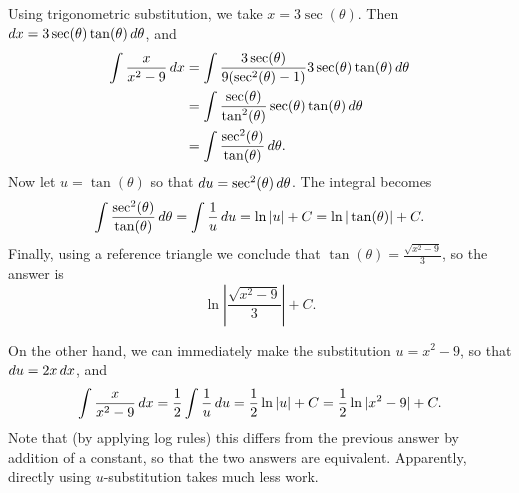 \documentclass[noauthor]{ximera}
\begin{document}
\begin{freeResponse}
Using trigonometric substitution, we take $x = 3 \sec(\theta)$. Then $\mathop{}\!d x = 3 \sec(\theta) \tan(\theta) \mathop{}\!d \theta$, and 
\begin{align*}
\int \frac{x}{x^2-9} \mathop{}\!d x &= \int \frac{3 \sec(\theta)}{9(\sec^2(\theta) - 1)} 3 \sec(\theta) \tan(\theta) \mathop{}\!d \theta \\
&= \int \frac{\sec(\theta)}{\tan^2(\theta)} \sec(\theta) \tan(\theta) \mathop{}\!d \theta \\
&= \int \frac{\sec^2(\theta)}{\tan(\theta)} \mathop{}\!d \theta.
\end{align*}
Now let $u = \tan(\theta)$ so that $\mathop{}\!d u = \sec^2(\theta) \mathop{}\!d \theta$. The integral becomes
$$
\int \frac{\sec^2(\theta)}{\tan(\theta)} \mathop{}\!d \theta = \int \frac{1}{u} \mathop{}\!d u = \ln |u| + C = \ln | \tan(\theta) | + C.
$$
Finally, using a reference triangle we conclude that $\tan(\theta) = \frac{\sqrt{x^2-9}}{3}$, so the answer is 
$$
\ln \left| \frac{\sqrt{x^2-9}}{3}\right| + C.
$$

On the other hand, we can immediately make the substitution $u = x^2 - 9$, so that $\mathop{}\!d u = 2x \mathop{}\!d x$, and 
$$
\int \frac{x}{x^2-9} \mathop{}\!d x = \frac{1}{2} \int \frac{1}{u} \mathop{}\!d u = \frac{1}{2} \ln |u| + C = \frac{1}{2} \ln |x^2-9| + C.
$$
Note that (by applying log rules) this differs from the previous answer by addition of a constant, so that the two answers are equivalent. Apparently, directly using $u$-substitution takes much less work. 
\end{freeResponse}
\end{document}
